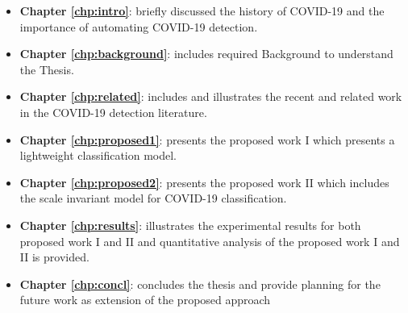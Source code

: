 \begin{itemize}
    \item \textbf{Chapter \ref{chp:intro}}: briefly discussed the history of COVID-19 and the importance of automating COVID-19 detection.
    \item \textbf{Chapter \ref{chp:background}}: includes required Background to understand the Thesis. 
    \item \textbf{Chapter \ref{chp:related}}: includes and illustrates the recent and related work in the COVID-19 detection literature. 
    \item \textbf{Chapter \ref{chp:proposed1}}: presents the proposed work I which presents a lightweight classification model.
    \item \textbf{Chapter \ref{chp:proposed2}}: presents the proposed work II which includes the scale invariant model for COVID-19 classification. 
    \item \textbf{Chapter \ref{chp:results}}: illustrates the experimental results for both proposed work I and II and quantitative analysis of the proposed work I and II is provided.
    \item \textbf{Chapter \ref{chp:concl}}: concludes the thesis and provide planning for the future work as extension of the proposed approach
\end{itemize}